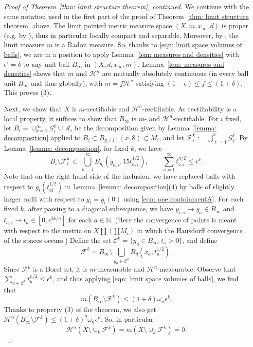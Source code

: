 \documentclass[11pt,reqno]{amsart}
\theoremstyle{remark}
\theoremstyle{definition}
\numberwithin{equation}{section}
\newcommand{\F}{{\mathcal{F}}}
\newcommand{\e}{{\epsilon}}
\newcommand{\Hi}{{\mathcal{H}}}
\newcommand{\om}{\omega}
\begin{document}
\begin{proof}[Proof of Theorem~\ref{thm: limit structure theorem}, continued]
We continue with the same notation used in the first part of the proof of Theorem~\ref{thm: limit structure theorem} above. The limit pointed metric measure space $(X, m,x_\infty, d)$ is proper (e.g. by \cite[Theorem 11.4.7]{MMSBOOK}), thus in particular locally compact and separable. Moreover, by \cite[Corollary 3.3.47]{MMSBOOK}, the limit measure $m$ is a Radon measure. So, thanks to \eqref{eqn: limit space volumes of balls}, we are in a position to apply  Lemma~\ref{lem: measures and densities} with $\e'=\delta$ to any unit ball $B_\infty$ in $(X,d, x_\infty, m)$. Lemma~\ref{lem: measures and densities} shows that $m$ and $\mathcal{H}^{n}$  are mutually absolutely continuous (in every ball unit $B_\infty$ and thus globally), with $m =f\mathcal{H}^{n}$ satisfying $(1-\e)\leq f \leq (1+\delta)$. This proves (3).


Next,  we show that $X$ is $m$-rectifiable and $\mathcal{H}^{n}$-rectifiable.
As rectifiability is a local property,  it suffices to show that  $B_\infty $ is $m$- and $\Hi^n$-rectifiable. For $i$ fixed, let $B_i=\cup_{k=1}^\infty \mathcal{G}_i^k\cup\mathcal{A}_i$ be the decomposition given by Lemma~\ref{lemma: decomposition} applied to $B_i \subset B_{g_i(1)}(x,8)\subset M_i$, and let $\F_i^k:=\bigcup_{\ell=1}^k\mathcal{G}_i^\ell$.
 By Lemma~\ref{lemma: decomposition}, for fixed $k$, we have
\begin{equation}
	B_i \setminus \F_i^k \,\subset \,\bigcup_{a=1}^\infty B_{g_i}(y_{a,i},15t_{a,i}^{1/2}), \qquad \sum_{a=1}^\infty t_{a,i}^{n/2}\leq \e^k.
\end{equation}
Note that on the right-hand side of the inclusion, we have replaced balls with respect to $g_i(t_{ai}^{1/2})$ in Lemma~\ref{lemma: decomposition}(4) by balls of slightly larger radii with respect to $g_i=g_i(0)$ using \eqref{eqn: one containmentA}.
For each fixed $k$, after passing to a diagonal subsequence, we have $y_{i,a}\to y_a \in B_\infty$ and $t_{a,i}\to t_a \in [0,\e^{2k/n}]$ for each $a\in\mathbb{N}$. (Here the convergence of points is meant with respect to the metric on $X\amalg (\amalg M_i)$ in which the Hausdorff convergence of the spaces occurs.) Define the set $\mathcal{C}^k = \{ y_a \in B_\infty: t_a >0\}$, and  define 
\begin{equation}\label{eqn: def of Ek}
\F^k = B_\infty \setminus \bigcup_{y_a \in \mathcal{C}^k} B_d(x_a, t_a^{1/2}).
\end{equation}
Since $\F^k$ is a Borel set, it is $m$-measurable and $\Hi^{n}$-measurable.
 Observe that $\sum_{a\in \mathcal{C}^k} t_a^{n/2}\leq \e^k$, and thus applying \eqref{eqn: limit space volumes of balls}, we find that
\begin{equation*}
	m(B_\infty\setminus \F^k) \leq  (1+\delta)\om_n \e^k.
\end{equation*} 
Thanks to property (3) of the theorem, we also get $\Hi^n (B_\infty\setminus \F^k) \leq (1+\delta)^2 \om_n \e^k$. So, in particular 
\begin{equation}
	\label{eqn: measure zero} 
\mathcal{H}^n (X \setminus \cup_k \mathcal{F}^k)= m (X \setminus \cup_k \mathcal{F}^k)  =0.
\end{equation}


\end{proof}
\end{document}
